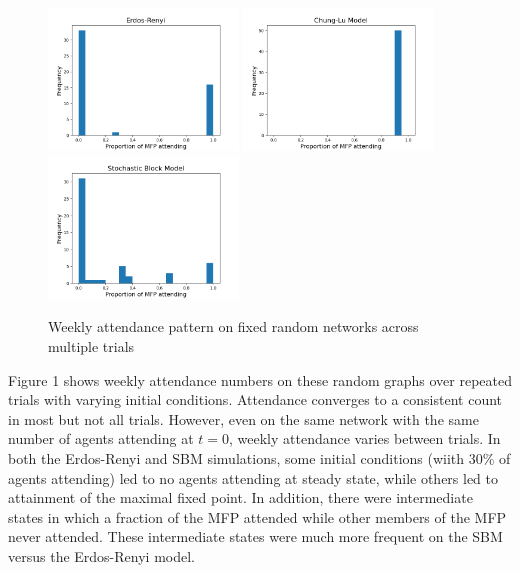 \documentclass[12pt]{article}
\begin{document}
\begin{figure}[h!]
  \includegraphics[width=0.45\textwidth]{gnp_attendance.png}
  \includegraphics[width=0.45\textwidth]{cm_attendance.png}
  \includegraphics[width=0.45\textwidth]{sbm_attendance.png}
  \caption{Weekly attendance pattern on fixed random networks across multiple trials}
\end{figure}

Figure 1 shows weekly attendance numbers on these random graphs over repeated trials with varying initial conditions.  Attendance converges to a consistent count in most but not all trials.  However, even on the same network with the same number of agents attending at $t=0$, weekly attendance varies between trials.  In both the Erdos-Renyi and SBM simulations, some initial conditions (wiith 30\% of agents attending) led to no agents attending at steady state, while others led to attainment of the maximal fixed point.  In addition, there were intermediate states in which a fraction of the MFP attended while other members of the MFP never attended.  These intermediate states were much more frequent on the SBM versus the Erdos-Renyi model. 
\end{document}
